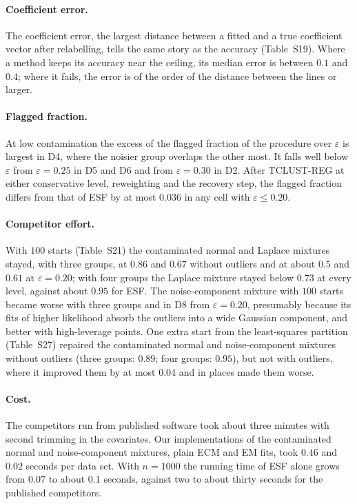 \paragraph{Coefficient error.} The coefficient error, the largest distance between a fitted
and a true coefficient vector after relabelling, tells the same story as the accuracy
(Table~S19). Where a method keeps its accuracy near the ceiling, its median error is between
$0.1$ and $0.4$; where it fails, the error is of the order of the distance between the lines or
larger.

\paragraph{Flagged fraction.} At low contamination the excess of the flagged fraction of the
procedure over $\varepsilon$ is largest in D4, where the noisier group overlaps the other most.
It falls well below $\varepsilon$ from $\varepsilon=0.25$ in D5 and D6 and from
$\varepsilon=0.30$ in D2. After TCLUST-REG at either conservative level, reweighting and the
recovery step, the flagged fraction differs from that of ESF by at most $0.036$ in any
cell with $\varepsilon\le0.20$.

\paragraph{Competitor effort.} With $100$ starts (Table~S21) the contaminated normal and
Laplace mixtures stayed, with three groups, at $0.86$ and $0.67$ without outliers and at about
$0.5$ and $0.61$ at $\varepsilon=0.20$; with four groups the Laplace mixture stayed below $0.73$
at every level, against about $0.95$ for ESF. The noise-component mixture with $100$
starts became worse with three groups and in D8 from $\varepsilon=0.20$, presumably because its
fits of higher likelihood absorb the outliers into a wide Gaussian component, and better with
high-leverage points. One extra start from the least-squares partition (Table~S27) repaired the
contaminated normal and noise-component mixtures without outliers (three groups: $0.89$; four
groups: $0.95$), but not with outliers, where it improved them by at most $0.04$ and in places
made them worse.

\paragraph{Cost.} The competitors run from published software took about three minutes with
second trimming in the covariates. Our implementations of the contaminated normal and
noise-component mixtures, plain ECM and EM fits, took $0.46$ and $0.02$ seconds per data set.
With $n=1000$ the running time of ESF alone grows from $0.07$ to about $0.1$ seconds,
against two to about thirty seconds for the published competitors.

